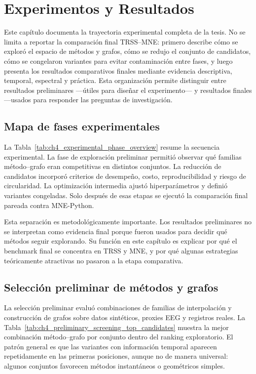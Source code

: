 \chapter{Experimentos y Resultados}
\label{ch:resultados}

Este capítulo documenta la trayectoria experimental completa de la tesis. No se limita a reportar la comparación final TRSS--MNE: primero describe cómo se exploró el espacio de métodos y grafos, cómo se redujo el conjunto de candidatos, cómo se congelaron variantes para evitar contaminación entre fases, y luego presenta los resultados comparativos finales mediante evidencia descriptiva, temporal, espectral y práctica. Esta organización permite distinguir entre resultados preliminares —útiles para diseñar el experimento— y resultados finales —usados para responder las preguntas de investigación.

\section{Mapa de fases experimentales}

La Tabla~\ref{tab:ch4_experimental_phase_overview} resume la secuencia experimental. La fase de exploración preliminar permitió observar qué familias método--grafo eran competitivas en distintos conjuntos. La reducción de candidatos incorporó criterios de desempeño, costo, reproducibilidad y riesgo de circularidad. La optimización intermedia ajustó hiperparámetros y definió variantes congeladas. Solo después de esas etapas se ejecutó la comparación final pareada contra MNE-Python.



Esta separación es metodológicamente importante. Los resultados preliminares no se interpretan como evidencia final porque fueron usados para decidir qué métodos seguir explorando. Su función en este capítulo es explicar por qué el benchmark final se concentra en TRSS y MNE, y por qué algunas estrategias teóricamente atractivas no pasaron a la etapa comparativa.

\section{Selección preliminar de métodos y grafos}

La selección preliminar evaluó combinaciones de familias de interpolación y construcción de grafos sobre datos sintéticos, proxies EEG y registros reales. La Tabla~\ref{tab:ch4_preliminary_screening_top_candidates} muestra la mejor combinación método--grafo por conjunto dentro del ranking exploratorio. El patrón general es que las variantes con información temporal aparecen repetidamente en las primeras posiciones, aunque no de manera universal: algunos conjuntos favorecen métodos instantáneos o geométricos simples.

